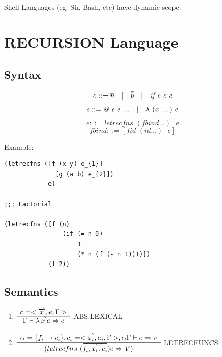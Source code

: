 Shell Languages (eg: Sh, Bash, etc) have dynamic scope.

\section{RECURSION Language}
\subsection{Syntax}
$$
e ::= \overline{n} \quad | \quad \overline{b} \quad | \quad \textit{if e e e} \\
$$
$$
e ::= \textit{@ e e ...} \quad | \quad \lambda \textit{ } (x \dots) \textit{ } e \\
$$
$$
e ::= \textit{letrecfns } (fbind \dots) \textit{ } e 
$$
$$
fbind ::= [\textit{fid } (id \dots) \textit{ } e]
$$

Example:
\begin{verbatim}
(letrecfns ([f (x y) e_{1}]
              [g (a b) e_{2}])
            e)

;;; Factorial

(letrecfns ([f (n) 
                (if (= n 0)
                    1
                    (* n (f (- n 1))))])
            (f 2))
\end{verbatim}

\subsection{Semantics}

\begin{enumerate}
\item $\bigfrac{c = <\overrightharpoonup{x}, e, \Gamma>}{\Gamma \vdash \lambda \overrightharpoonup{x} e \Rightarrow c}$ ABS LEXICAL
\item $\bigfrac{\alpha = \{f_{i} \mapsto c_{i}\}, c_{i} = <\overrightharpoonup{x_{i}}, e_{i}, \Gamma>, \alpha\Gamma \vdash e \Rightarrow v}{(letrecfns \textit{ }(\overrightharpoonup{f_{i}, \overrightharpoonup{x_{i}}, e_{i}}) e \Rightarrow V)}$ LETRECFUNCS
\end{enumerate}

